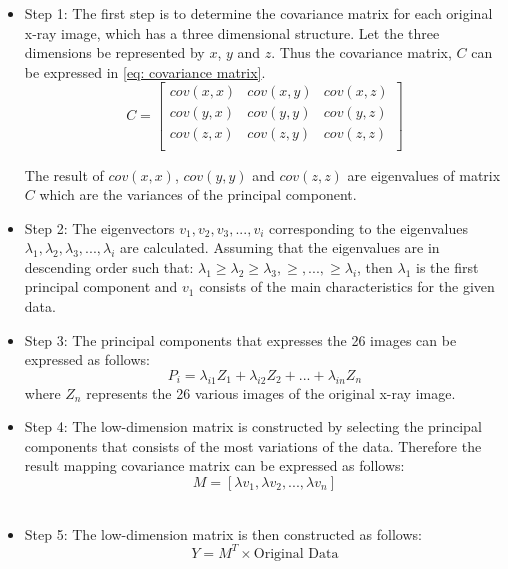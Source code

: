 \documentclass[11pt]{article}
\begin{document}
	\begin{itemize}
		\item Step 1: The first step is to determine the covariance matrix for each original x-ray image, which has a three dimensional structure. Let the three dimensions be represented by $x$, $y$ and $z$. Thus the covariance matrix, $C$ can be expressed in \eqref{eq: covariance matrix}.
		\begin{equation}
		\label{eq: covariance matrix}
		C = 
		\begin{bmatrix}
		cov(x,x) & cov(x,y) & cov(x,z) \\
		cov(y,x) & cov(y,y) & cov(y,z) \\
		cov(z,x) & cov(z,y) & cov(z,z) \\
		\end{bmatrix}
		\end{equation}
		
		The result of $cov(x,x)$, $cov(y,y)$ and $cov(z,z)$ are eigenvalues of matrix $C$ which are the variances of the principal component.\\
		\item Step 2: The eigenvectors $v_1, v_2, v_3, ... , v_i$ corresponding to the eigenvalues \newline $\lambda_1, \lambda_2, \lambda_3, ... , \lambda_i$ are calculated. Assuming that the eigenvalues are in descending order such that: $\lambda_1 \geq \lambda_2 \geq \lambda_3, \geq, ...,\geq \lambda_i$, then $\lambda_1$ is the first principal component and $v_1$ consists of the main characteristics for the given data. \\
		\item Step 3: The principal components that expresses the 26 images can be expressed as follows:
		\begin{equation}
		P_i = \lambda_{i1}Z_1 + \lambda_{i2}Z_2 + ... + \lambda_{in}Z_n
		\end{equation} 
		where $Z_n$ represents the 26 various images of the original x-ray image. \\
		\item Step 4: The low-dimension matrix is constructed by selecting the principal components that consists of the most variations of the data. Therefore the result mapping covariance matrix can be expressed as follows: 
		\begin{equation}
		M = [\lambda v_1, \lambda v_2, ... , \lambda v_n]
		\end{equation} \\
		\item Step 5: The low-dimension matrix is then constructed as follows:
		\begin{equation}
		Y = M^T \times \text{Original Data}
		\end{equation}
	\end{itemize}
	
\end{document}
